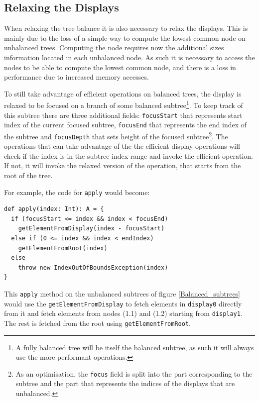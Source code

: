 
\subsection{Relaxing the Displays}
When relaxing the tree balance it is also necessary to relax the displays. This is mainly due to the loss of a simple way to compute the lowest common node on unbalanced trees. Computing the node requires now the additional sizes information located in each unbalanced node. As such it is necessary to access the nodes to be able to compute the lowest common node, and there is a loss in performance due to increased memory accesses.  

To still take advantage of efficient operations on balanced trees, the display is relaxed to be focused on a branch of some balanced subtree\footnote{A fully balanced tree will be itself the balanced subtree, as such it will always use the more performant operations.}. To keep track of this subtree there are three additional fields: \texttt{focusStart} that represents start index of the current focused subtree, \texttt{focusEnd} that represents the end index of the subtree and \texttt{focusDepth} that sets  height of the focused subtree\footnote{As an optimisation, the \texttt{focus} field is split into the part corresponding to the subtree and the part that represents the indices of the displays that are unbalanced.}. The operations that can take advantage of the the efficient display operations will check if the index is in the subtree index range and invoke the efficient operation. If not, it will invoke the relaxed version of the operation, that starts from the root of the tree.

For example, the code for \texttt{apply} would become:
\begin{lstlisting}[frame=single]
def apply(index: Int): A = {
  if (focusStart <= index && index < focusEnd) 
    getElementFromDisplay(index - focusStart)
  else if (0 <= index && index < endIndex) 
    getElementFromRoot(index)    
  else 
    throw new IndexOutOfBoundsException(index)
}
\end{lstlisting}

This \texttt{apply} method on the unbalanced subtrees of figure \ref{Balanced_subtrees}  would use the \texttt{getElementFromDisplay} to fetch elements in \texttt{display0} directly from it and fetch elements from nodes (1.1) and (1.2) starting from \texttt{display1}. The rest is fetched from the root using \texttt{getElementFromRoot}.

